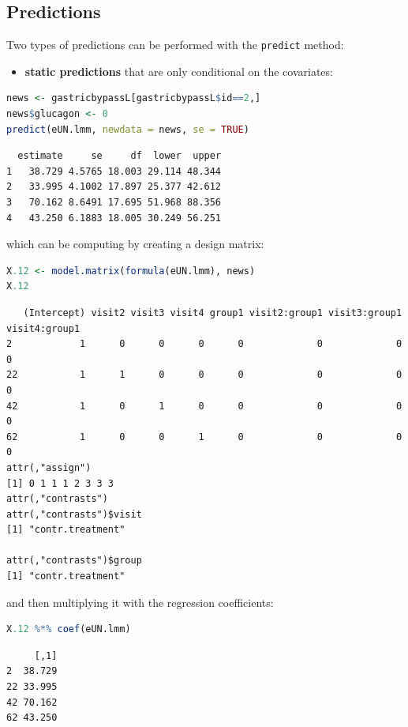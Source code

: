 \documentclass[12pt]{article}
\begin{document}
\clearpage
\subsection{Predictions}
\label{sec:org9d8a77f}

Two types of predictions can be performed with the \texttt{predict} method:
\begin{itemize}
\item \textbf{static predictions} that are only conditional on the covariates:
\end{itemize}
\begin{lstlisting}[language=r,numbers=none]
news <- gastricbypassL[gastricbypassL$id==2,]
news$glucagon <- 0
predict(eUN.lmm, newdata = news, se = TRUE)
\end{lstlisting}

\label{}
\begin{verbatim}
  estimate     se     df  lower  upper
1   38.729 4.5765 18.003 29.114 48.344
2   33.995 4.1002 17.897 25.377 42.612
3   70.162 8.6491 17.695 51.968 88.356
4   43.250 6.1883 18.005 30.249 56.251
\end{verbatim}


which can be computing by creating a design matrix:
\begin{lstlisting}[language=r,numbers=none]
X.12 <- model.matrix(formula(eUN.lmm), news)
X.12
\end{lstlisting}

\label{}
\begin{verbatim}
   (Intercept) visit2 visit3 visit4 group1 visit2:group1 visit3:group1 visit4:group1
2            1      0      0      0      0             0             0             0
22           1      1      0      0      0             0             0             0
42           1      0      1      0      0             0             0             0
62           1      0      0      1      0             0             0             0
attr(,"assign")
[1] 0 1 1 1 2 3 3 3
attr(,"contrasts")
attr(,"contrasts")$visit
[1] "contr.treatment"

attr(,"contrasts")$group
[1] "contr.treatment"
\end{verbatim}

and then multiplying it with the regression coefficients:
\begin{lstlisting}[language=r,numbers=none]
X.12 %*% coef(eUN.lmm)
\end{lstlisting}

\label{}
\begin{verbatim}
     [,1]
2  38.729
22 33.995
42 70.162
62 43.250
\end{verbatim}
\end{document}
